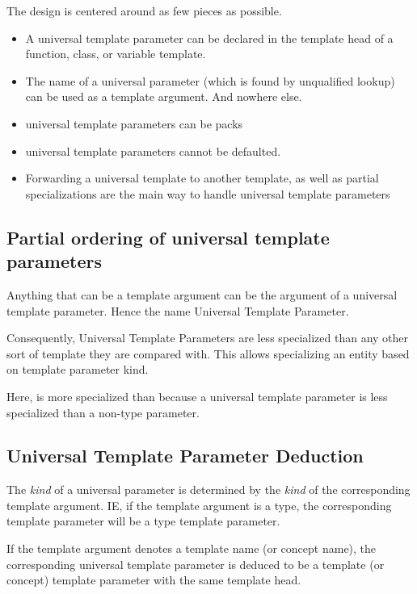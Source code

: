 \documentclass{wg21}
\begin{document}
The design is centered around as few pieces as possible.
\begin{itemize}
\item A universal template parameter can be declared in the template head of a function, class, or variable template.
\item The name of a universal parameter (which is found by unqualified lookup) can be used as a template argument. And nowhere else.
\item universal template parameters can be packs
\item universal template parameters cannot be defaulted.
\item Forwarding a universal template to another template, as well as partial specializations are the main way to handle universal template parameters
\end{itemize}

\subsection{Partial ordering of universal template parameters}

Anything that can be a template argument can be the argument of a universal template parameter. Hence the name Universal Template Parameter.

Consequently, Universal Template Parameters are less specialized than any other sort of template they are compared with.
This allows specializing an entity based on template parameter kind.


Here,  is more specialized than  because a universal template parameter is less specialized than a non-type parameter.

\subsection{Universal Template Parameter Deduction}

The \emph{kind} of a universal parameter is determined by the \emph{kind} of the corresponding template argument.
IE, if the template argument is a type, the corresponding template parameter will be a type template parameter.

If the template argument denotes a template name (or concept name), the corresponding universal template parameter
is deduced to be a template (or concept) template parameter with the same template head.
\end{document}
